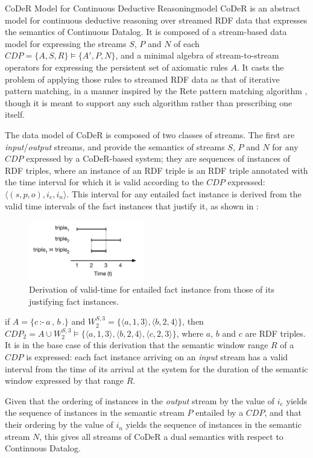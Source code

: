 \begin{nestedsection}{CoDeR Model for Continuous Deductive Reasoning}{model}
	CoDeR is an abstract model for continuous deductive reasoning over streamed RDF data that expresses the semantics of Continuous Datalog.
	It is composed of a stream-based data model for expressing the streams $S$, $P$ and $N$ of each ${CDP = \{A,S,R\} \vDash \{A',P,N\}}$, and a minimal algebra of stream-to-stream operators for expressing the persistent set of axiomatic rules $A$.
	It casts the problem of applying those rules to streamed RDF data as that of iterative pattern matching, in a manner inspired by the Rete pattern matching algorithm \citep{forgy79}, though it is meant to support any such algorithm rather than prescribing one itself.

	The data model of CoDeR is composed of two classes of streams.
	The first are \emph{input}/\emph{output} streams, and provide the semantics of streams $S$, $P$ and $N$ for any ${CDP}$ expressed by a CoDeR-based system;
	they are sequences of instances of RDF triples, where an instance of an RDF triple is an RDF triple annotated with the time interval for which it is valid \citep{SemanticStreamingManagement,sparkwave} according to the ${CDP}$ expressed: ${\langle (s,p,o),i_{e},i_{n} \rangle}$.
	This interval for any entailed fact instance is derived from the valid time intervals of the fact instances that justify it, as shown in :
	\begin{figure}[t]
		\centering
		\includegraphics[width=0.45\textwidth]{intersected-intervals}
		\caption{Derivation of valid-time for entailed fact instance from those of its justifying fact instances.}
	\end{figure}
	if ${A = \{c\,\text{:-}\,a\,,\,b\,.\}}$ and ${W^{S,3}_{2} = \{ \langle a,1,3 \rangle , \langle b,2,4 \rangle \}}$, then ${CDP_{2} = A \cup W^{S,3}_{2} \vDash \{ \langle a,1,3 \rangle , \langle b,2,4 \rangle , \langle c,2,3 \rangle \}}$, where $a$, $b$ and $c$ are RDF triples.
	It is in the base case of this derivation that the semantic window range $R$ of a ${CDP}$ is expressed:
	each fact instance arriving on an \emph{input} stream has a valid interval from the time of its arrival at the system for the duration of the semantic window expressed by that range $R$.

	Given that the ordering of instances in the \emph{output} stream by the value of $i_{e}$ yields the sequence of instances in the semantic stream $P$ entailed by a ${CDP}$, and that their ordering by the value of $i_{n}$ yields the sequence of instances in the semantic stream $N$, this gives all streams of CoDeR a dual semantics with respect to Continuous Datalog.


\end{nestedsection}